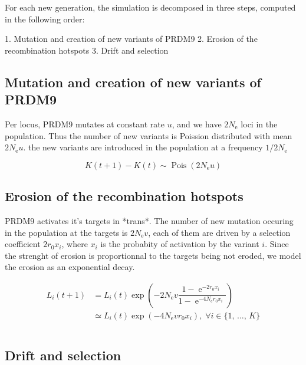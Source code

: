 \documentclass{article}
\begin{document}
For each new generation, the simulation is decomposed in three steps, computed in the following order: 

1. Mutation and creation of new variants of PRDM9
2. Erosion of the recombination hotspots
3. Drift and selection

\subsection{Mutation and creation of new variants of PRDM9} 

Per locus, PRDM9 mutates at constant rate $u$, and we have $2 N_\mathrm{e}$ loci in the population. Thus the number of new variants is Poission distributed with mean $2 N_\mathrm{e} u$. the new variants are introduced in the population at a frequency $1 / 2 N_\mathrm{e}$

\begin{equation}
  K(t+1) - K(t) \sim \operatorname{Pois} \left(2 N_\mathrm{e} u \right)
\end{equation}


\subsection{Erosion of the recombination hotspots} 

PRDM9 activates it's targets in *trans*. The number of new mutation occuring in the population at the targets is $2 N_\mathrm{e} v$, each of them are driven by a selection coefficient $2 r _0  x_i$, where $x_i$ is the probabity of activation by the variant $i$.
Since the strenght of erosion is proportionnal to the targets being not eroded, we model the erosion as an exponential decay.

\begin{equation}
  \begin{aligned}
 L_i (t+1) &=  L_i (t)\operatorname{exp} \left( - 2 N_\mathrm{e} v
 \dfrac{1 - \operatorname{e}^{-2 r _0  x_i}}{1 - \operatorname{e}^{-4 N_\mathrm{e} r _0  x_i}} \right)  \\
 &\simeq
    L_i (t)\operatorname{exp} \left( - 4 N_\mathrm{e} v
 r _0  x_i \right), \;
 \forall i \in \{ 1, \, \dots, \, K \} \\ \\
 \end{aligned}
\end{equation}


\subsection{Drift and selection} 
\end{document}
